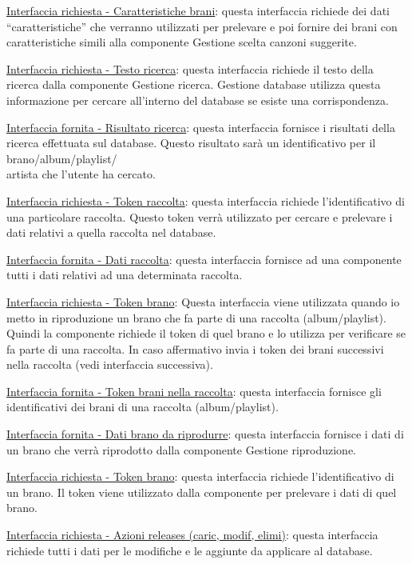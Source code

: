 \documentclass[a4paper,12pt]{article}
\begin{document}
\underline{Interfaccia richiesta - Caratteristiche brani}: questa interfaccia richiede dei dati “caratteristiche” che verranno utilizzati per prelevare e poi fornire dei brani con caratteristiche simili alla componente Gestione scelta canzoni suggerite. 

\underline{Interfaccia richiesta - Testo ricerca}: questa interfaccia richiede il testo della ricerca dalla componente Gestione ricerca. Gestione database utilizza questa informazione per cercare all’interno del database se esiste una corrispondenza.

\underline{Interfaccia fornita - Risultato ricerca}: questa interfaccia fornisce i risultati della ricerca effettuata sul database. Questo risultato sarà un identificativo per il brano/album/playlist/\\artista che l’utente ha cercato.

\underline{Interfaccia richiesta - Token raccolta}: questa interfaccia richiede l’identificativo di una particolare raccolta. Questo token verrà utilizzato per cercare e prelevare i dati relativi a quella raccolta nel database.

\underline{Interfaccia fornita - Dati  raccolta}: questa interfaccia fornisce ad una componente tutti i dati relativi ad una determinata raccolta.

\underline{Interfaccia richiesta - Token brano}: Questa interfaccia viene utilizzata quando io metto in riproduzione un brano che fa parte di una raccolta (album/playlist). Quindi la componente richiede il token di quel brano e lo utilizza per verificare se fa parte di una raccolta. In caso affermativo invia i token dei brani successivi nella raccolta (vedi interfaccia successiva).

\underline{Interfaccia fornita - Token brani nella raccolta}: questa interfaccia fornisce gli identificativi dei brani di una raccolta (album/playlist).

\underline{Interfaccia fornita - Dati brano da riprodurre}: questa interfaccia fornisce i dati di un brano che verrà riprodotto dalla componente Gestione riproduzione.

\underline{Interfaccia richiesta - Token brano}: questa interfaccia richiede l’identificativo di un brano. Il token viene utilizzato dalla componente per prelevare i dati di quel brano.

\underline{Interfaccia richiesta - Azioni releases (caric, modif, elimi)}: questa interfaccia richiede tutti i dati per le modifiche e le aggiunte da applicare al database.
\end{document}
